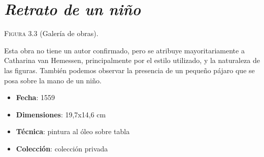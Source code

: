 \documentclass[12pt]{book}
\begin{document}
\section{\textit{Retrato de un niño}}

\textsc{Figura 3.3} (Galería de obras).\bigskip

Esta obra no tiene un autor confirmado, pero se atribuye mayoritariamente a Catharina van Hemessen, principalmente por el estilo utilizado, y la naturaleza de las figuras. También podemos observar la presencia de un pequeño pájaro que se posa sobre la mano de un niño.
\begin{itemize}
	\item \textbf{Fecha}: 1559
	\item \textbf{Dimensiones}: 19,7x14,6 cm
	\item \textbf{Técnica}: pintura al óleo sobre tabla
	\item \textbf{Colección}: colección privada
\end{itemize}
\end{document}
